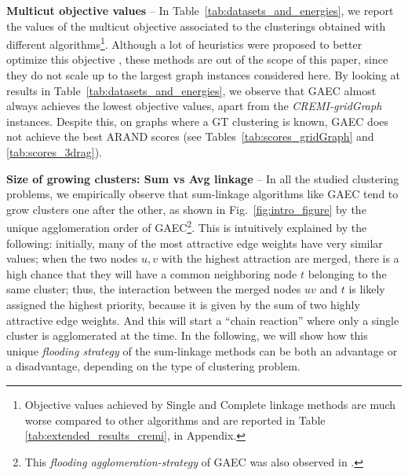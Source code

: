 \textbf{Multicut objective values} -- In Table~\ref{tab:datasets_and_energies}, we report the values of the multicut objective associated to the clusterings obtained with different \algname{} algorithms\footnote{Objective values achieved by Single and Complete linkage methods are much worse compared to other algorithms and are reported in Table \ref{tab:extended_results_cremi}, in Appendix.}. Although a lot of heuristics were proposed to better optimize this objective \cite{beier2016efficient,beier2014cut,kernighan1970efficient}, these methods are out of the scope of this paper, since they do not scale up to the largest graph instances considered here. By looking at results in Table~\ref{tab:datasets_and_energies}, we observe that GAEC almost always achieves the lowest objective values, apart from the \emph{CREMI-gridGraph} instances. Despite this, on graphs where a GT clustering is known, GAEC does not achieve the best ARAND scores (see Tables~\ref{tab:scores_gridGraph} and \ref{tab:scores_3drag}). 

\textbf{Size of growing clusters: Sum vs Avg linkage} -- 
In all the studied clustering problems, we empirically observe that sum-linkage algorithms like GAEC tend to grow clusters one after the other, as shown in Fig.\ \ref{fig:intro_figure} by the unique agglomeration order of GAEC\footnote{This \emph{flooding agglomeration-strategy} of GAEC was also observed in \cite{kardoostsolving}.}. This is intuitively explained by the  following: initially, many of the most attractive edge weights have very similar values; when the two nodes $u,v$ with the highest attraction are merged, there is a high chance that they will have a common neighboring node $t$ belonging to the same cluster; thus, the interaction between the merged nodes $uv$ and $t$ is likely assigned the highest priority, because it is given by the sum of two highly attractive edge weights. And this will start a ``chain reaction'' where only a single cluster is agglomerated at the time. 
In the following, we will show how this unique \emph{flooding strategy} of the sum-linkage methods can be both an advantage or a disadvantage, depending on the type of clustering problem. 

